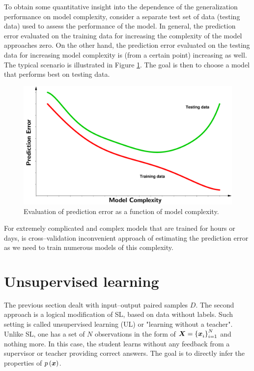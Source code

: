 To obtain some quantitative insight into the dependence of the generalization performance on model complexity, consider a separate test set of data (testing data) used to assess the performance of the model. 
In general, the prediction error evaluated on the training data for increasing the complexity of the model approaches zero. On the other hand, the prediction error evaluated on the testing data for increasing model complexity is (from a certain point) increasing as well. The typical scenario is illustrated in Figure \ref{fig:Prediction_error}. The goal is then to choose a model that performs best on testing data.
 \begin{figure}[h]
	\centering
	\includegraphics[width=16.0cm]{plots/Images/PE3.pdf}
	\caption{Evaluation of prediction error as a function of model complexity.}%
	\label{fig:Prediction_error}%
\end{figure}
For extremely complicated and complex models that are trained for hours or days, is cross--validation inconvenient approach of estimating the prediction error as we need to train numerous models of this complexity.
\section{Unsupervised learning}
The previous section dealt with input--output paired samples $D$. The second approach is a logical modification of SL, based on data without labels. Such setting is called unsupervised learning (UL) or "learning without a teacher". Unlike SL, one has a set of $N$ observations in the form of $\boldsymbol{X} = \left\lbrace \boldsymbol{x}_i^{}\right\rbrace_{i=1}^N$ and nothing more. In this case, the student learns without any feedback from a supervisor or teacher providing correct answers. The goal is to directly infer the properties of $p\left( \boldsymbol{x} \right)$.




